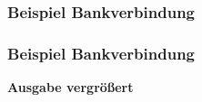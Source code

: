 \documentclass[12pt,ngerman]{beamer}
\begin{document}
\begin{frame}[containsverbatim]
\frametitle{Beispiel Bankverbindung}

\begin{center}
\end{center}

\end{frame}

\begin{frame}[containsverbatim]
\frametitle{Beispiel Bankverbindung}

\textbf{Ausgabe vergrößert}

\begin{center}
\end{center}

\end{frame}
\end{document}
